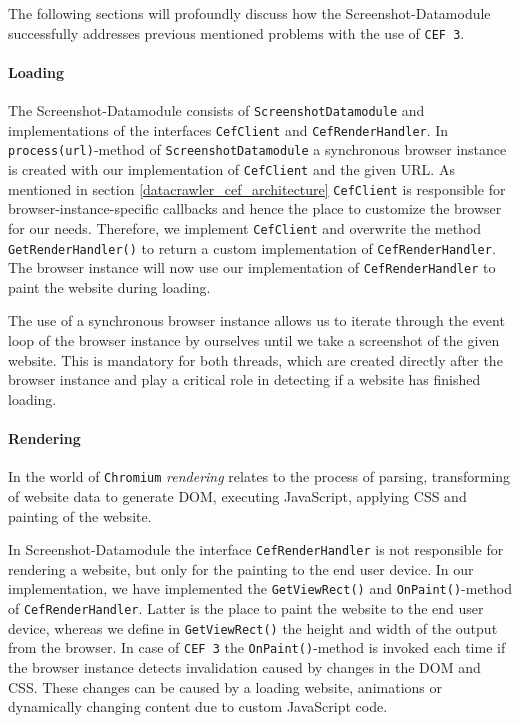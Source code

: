 The following sections will profoundly discuss how the Screenshot-Datamodule successfully addresses previous mentioned problems with the use of \texttt{CEF 3}.

\paragraph{Loading} 
The Screenshot-Datamodule consists of \texttt{ScreenshotDatamodule} and implementations of the interfaces \texttt{CefClient} and \texttt{CefRenderHandler}. In \texttt{process(url)}-method of \texttt{ScreenshotDatamodule} a synchronous browser instance is created with our implementation of \texttt{CefClient} and the given URL. As mentioned in section \ref{datacrawler_cef_architecture} \texttt{CefClient} is responsible for browser-instance-specific callbacks and hence the place to customize the browser for our needs. Therefore, we implement \texttt{CefClient} and overwrite the method \texttt{GetRenderHandler()} to return a custom implementation of \texttt{CefRenderHandler}. The browser instance will now use our implementation of \texttt{CefRenderHandler} to paint the website during loading.

The use of a synchronous browser instance allows us to iterate through the event loop of the browser instance by ourselves until we take a screenshot of the given website. This is mandatory for both threads, which are created directly after the browser instance and play a critical role in detecting if a website has finished loading. 

\paragraph{Rendering}
In the world of \texttt{Chromium} \textit{rendering} relates to the process of parsing, transforming of website data to generate DOM, executing JavaScript, applying CSS and painting of the website. 

In Screenshot-Datamodule the interface \texttt{CefRenderHandler} is not responsible for rendering a website, but only for the painting to the end user device. In our implementation, we have implemented the \texttt{GetViewRect()} and \texttt{OnPaint()}-method of \texttt{CefRenderHandler}. Latter is the place to paint the website to the end user device, whereas we define in \texttt{GetViewRect()} the height and width of the output from the browser. In case of \texttt{CEF 3} the \texttt{OnPaint()}-method is invoked each time if the browser instance detects invalidation caused by changes in the DOM and CSS. These changes can be caused by a loading website, animations or dynamically changing content due to custom JavaScript code.

